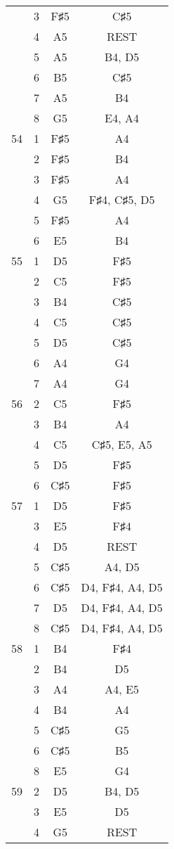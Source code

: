 \documentclass{article}
\begin{document}
\begin{longtable}{|c|c|c|c|}
  & 3 & F♯5 & C♯5 \\ 
  & 4 & A5 & REST \\ 
  & 5 & A5 & B4, D5 \\ 
  & 6 & B5 & C♯5 \\ 
  & 7 & A5 & B4 \\ 
  & 8 & G5 & E4, A4 \\ 
\hline
54 & 1 & F♯5 & A4 \\ 
  & 2 & F♯5 & B4 \\ 
  & 3 & F♯5 & A4 \\ 
  & 4 & G5 & F♯4, C♯5, D5 \\ 
  & 5 & F♯5 & A4 \\ 
  & 6 & E5 & B4 \\ 
\hline
55 & 1 & D5 & F♯5 \\ 
  & 2 & C5 & F♯5 \\ 
  & 3 & B4 & C♯5 \\ 
  & 4 & C5 & C♯5 \\ 
  & 5 & D5 & C♯5 \\ 
  & 6 & A4 & G4 \\ 
  & 7 & A4 & G4 \\ 
\hline
56 & 2 & C5 & F♯5 \\ 
  & 3 & B4 & A4 \\ 
  & 4 & C5 & C♯5, E5, A5 \\ 
  & 5 & D5 & F♯5 \\ 
  & 6 & C♯5 & F♯5 \\ 
\hline
57 & 1 & D5 & F♯5 \\ 
  & 3 & E5 & F♯4 \\ 
  & 4 & D5 & REST \\ 
  & 5 & C♯5 & A4, D5 \\ 
  & 6 & C♯5 & D4, F♯4, A4, D5 \\ 
  & 7 & D5 & D4, F♯4, A4, D5 \\ 
  & 8 & C♯5 & D4, F♯4, A4, D5 \\ 
\hline
58 & 1 & B4 & F♯4 \\ 
  & 2 & B4 & D5 \\ 
  & 3 & A4 & A4, E5 \\ 
  & 4 & B4 & A4 \\ 
  & 5 & C♯5 & G5 \\ 
  & 6 & C♯5 & B5 \\ 
  & 8 & E5 & G4 \\ 
\hline
59 & 2 & D5 & B4, D5 \\ 
  & 3 & E5 & D5 \\ 
  & 4 & G5 & REST \\ 

\end{longtable}
\end{document}
